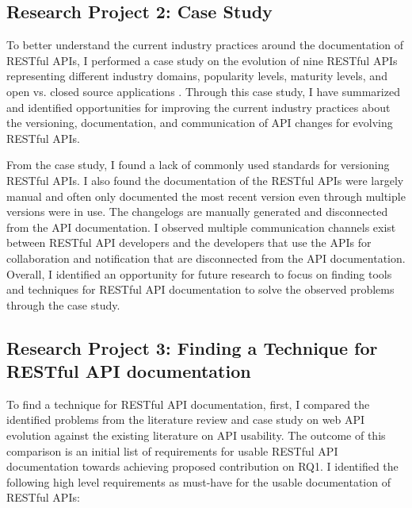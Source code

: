 \documentclass[11pt,oneside]{book}
\begin{document}
\subsection{Research Project 2: Case Study}

To better understand the current industry practices around the documentation of RESTful APIs, I performed a case study on the evolution of nine RESTful APIs representing different industry domains, popularity levels, maturity levels, and open vs. closed source applications \cite{sohan2015case}. Through this case study, I have summarized and identified opportunities for improving the current industry practices about the versioning, documentation, and communication of API changes for evolving RESTful APIs.

From the case study, I found a lack of commonly used standards for versioning RESTful APIs. I also found the documentation of the RESTful APIs were largely manual and often only documented the most recent version even through multiple versions were in use. The changelogs are manually generated and disconnected from the API documentation. I observed multiple communication channels exist between RESTful API developers and the developers that use the APIs for collaboration and notification that are disconnected from the API documentation. Overall, I identified an opportunity for future research to focus on finding tools and techniques for RESTful API documentation to solve the observed problems through the case study.

\subsection{Research Project 3: Finding a Technique for RESTful API documentation}

To find a technique for RESTful API documentation, first, I compared the identified problems from the literature review and case study on web API evolution against the existing literature on API usability. The outcome of this comparison is an initial list of requirements for usable RESTful API documentation towards achieving proposed contribution on RQ1. I identified the following high level requirements as must-have for the usable documentation of RESTful APIs:
\end{document}
